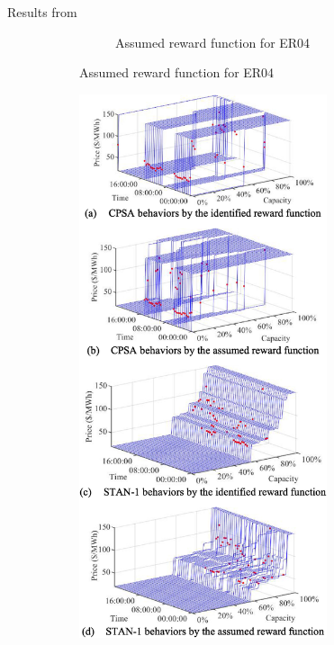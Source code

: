 \documentclass[12pt]{beamer}
\begin{document}
\begin{frame}{Results from \parencite{objective_function_meta}}
\begin{figure}[h!]
\begin{subfigure}{0.4\textwidth}
\begin{subfigure}{\textwidth}
        \caption{Assumed reward function for ER04}
      \end{subfigure}
    \end{subfigure}%
    \begin{subfigure}{0.4\textwidth}
      \centering
      \includegraphics[height=0.8\textheight,width=0.8\textwidth]{./identified_vs_assumed_02.png}
    \end{subfigure}%
  \end{figure}
\end{frame}
\end{document}

